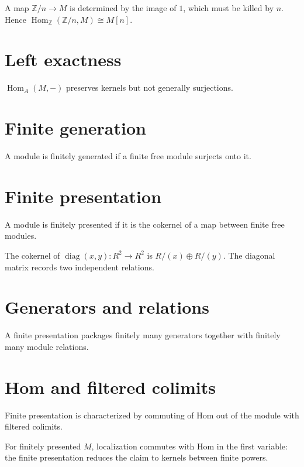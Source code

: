 \begin{example}\label{ex:v12-expand-01}
A map $\mathbb Z/n\to M$ is determined by the image of $1$, which must be killed by $n$. Hence $\operatorname{Hom}_{\mathbb Z}(\mathbb Z/n,M)\cong M[n]$.
\end{example}
\section{Left exactness}
$\operatorname{Hom}_A(M,-)$ preserves kernels but not generally surjections.

\section{Finite generation}
A module is finitely generated if a finite free module surjects onto it.

\section{Finite presentation}
A module is finitely presented if it is the cokernel of a map between finite free modules.

\begin{example}\label{ex:v12-expand-02}
The cokernel of $\operatorname{diag}(x,y):R^2\to R^2$ is $R/(x)\oplus R/(y)$. The diagonal matrix records two independent relations.
\end{example}
\section{Generators and relations}
A finite presentation packages finitely many generators together with finitely many module relations.

\section{Hom and filtered colimits}
Finite presentation is characterized by commuting of Hom out of the module with filtered colimits.

\begin{example}\label{ex:v12-expand-03}
For finitely presented $M$, localization commutes with Hom in the first variable: the finite presentation reduces the claim to kernels between finite powers.
\end{example}
